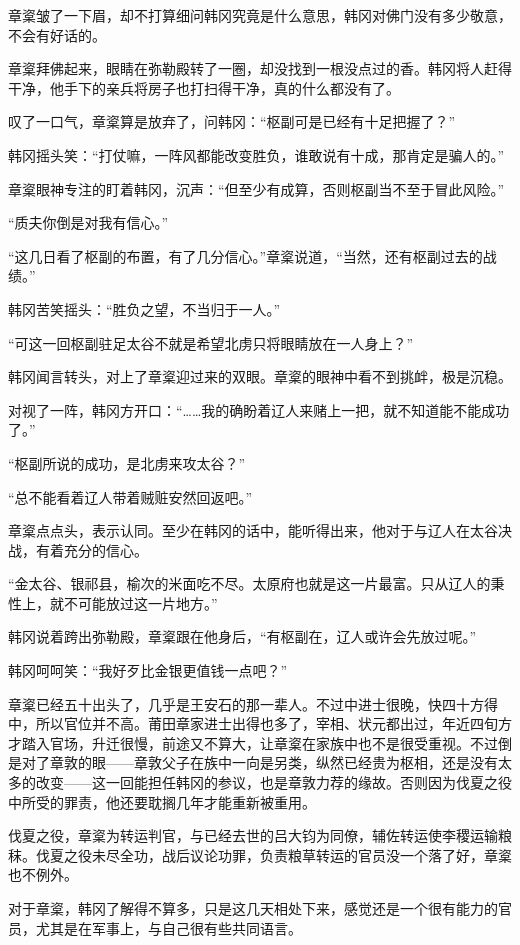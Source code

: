 章楶皱了一下眉，却不打算细问韩冈究竟是什么意思，韩冈对佛门没有多少敬意，不会有好话的。

章楶拜佛起来，眼睛在弥勒殿转了一圈，却没找到一根没点过的香。韩冈将人赶得干净，他手下的亲兵将房子也打扫得干净，真的什么都没有了。

叹了一口气，章楶算是放弃了，问韩冈：“枢副可是已经有十足把握了？”

韩冈摇头笑：“打仗嘛，一阵风都能改变胜负，谁敢说有十成，那肯定是骗人的。”

章楶眼神专注的盯着韩冈，沉声：“但至少有成算，否则枢副当不至于冒此风险。”

“质夫你倒是对我有信心。”

“这几日看了枢副的布置，有了几分信心。”章楶说道，“当然，还有枢副过去的战绩。”

韩冈苦笑摇头：“胜负之望，不当归于一人。”

“可这一回枢副驻足太谷不就是希望北虏只将眼睛放在一人身上？”

韩冈闻言转头，对上了章楶迎过来的双眼。章楶的眼神中看不到挑衅，极是沉稳。


对视了一阵，韩冈方开口：“……我的确盼着辽人来赌上一把，就不知道能不能成功了。”

“枢副所说的成功，是北虏来攻太谷？”

“总不能看着辽人带着贼赃安然回返吧。”

章楶点点头，表示认同。至少在韩冈的话中，能听得出来，他对于与辽人在太谷决战，有着充分的信心。

“金太谷、银祁县，榆次的米面吃不尽。太原府也就是这一片最富。只从辽人的秉性上，就不可能放过这一片地方。”

韩冈说着跨出弥勒殿，章楶跟在他身后，“有枢副在，辽人或许会先放过呢。”

韩冈呵呵笑：“我好歹比金银更值钱一点吧？”

章楶已经五十出头了，几乎是王安石的那一辈人。不过中进士很晚，快四十方得中，所以官位并不高。莆田章家进士出得也多了，宰相、状元都出过，年近四旬方才踏入官场，升迁很慢，前途又不算大，让章楶在家族中也不是很受重视。不过倒是对了章敦的眼——章敦父子在族中一向是另类，纵然已经贵为枢相，还是没有太多的改变——这一回能担任韩冈的参议，也是章敦力荐的缘故。否则因为伐夏之役中所受的罪责，他还要耽搁几年才能重新被重用。

伐夏之役，章楶为转运判官，与已经去世的吕大钧为同僚，辅佐转运使李稷运输粮秣。伐夏之役未尽全功，战后议论功罪，负责粮草转运的官员没一个落了好，章楶也不例外。

对于章楶，韩冈了解得不算多，只是这几天相处下来，感觉还是一个很有能力的官员，尤其是在军事上，与自己很有些共同语言。

